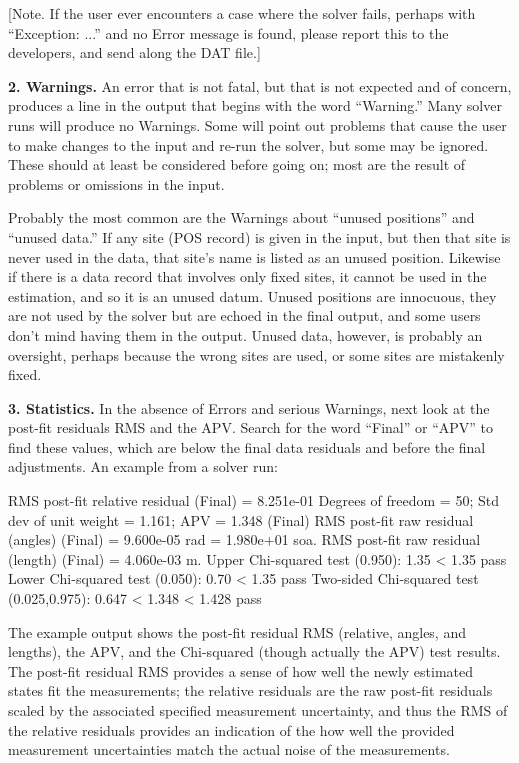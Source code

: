 [Note. If the user ever encounters a case where the solver fails, perhaps with ``Exception: ...'' and no Error message is found, please report this to the developers, and send along the DAT file.]

\textbf{2. Warnings.} An error that is not fatal, but that is not expected and of concern, produces a line in the output that begins with the word ``Warning.'' Many solver runs will produce no Warnings. Some will point out problems that cause the user to make changes to the input and re-run the solver, but some may be ignored. These should at least be considered before going on; most are the result of problems or omissions in the input.

Probably the most common are the Warnings about ``unused positions'' and ``unused data.'' If any site (POS record) is given in the input, but then that site is never used in the data, that site's name is listed as an unused position. Likewise if there is a data record that involves only fixed sites, it cannot be used in the estimation, and so it is an unused datum. Unused positions are innocuous, they are not used by the solver but are echoed in the final output, and some users don't mind having them in the output. Unused data, however, is probably an oversight, perhaps because the wrong sites are used, or some sites are mistakenly fixed.

\textbf{3. Statistics.} In the absence of Errors and serious Warnings, next look at the post-fit residuals RMS and the APV. Search for the word ``Final'' or ``APV'' to find these values, which are below the final data residuals and before the final adjustments. An example from a solver run:

\begin{Snippet}
 RMS post-fit relative residual (Final) = 8.251e-01
 Degrees of freedom = 50; Std dev of unit weight = 1.161; APV = 1.348 (Final)
 RMS post-fit raw residual (angles) (Final) = 9.600e-05 rad = 1.980e+01 soa.
 RMS post-fit raw residual (length) (Final) = 4.060e-03 m.
 Upper Chi-squared test (0.950): 1.35 < 1.35 pass
 Lower Chi-squared test (0.050): 0.70 < 1.35 pass
 Two-sided Chi-squared test (0.025,0.975): 0.647 < 1.348 < 1.428 pass
\end{Snippet}

The example output shows the post-fit residual RMS (relative, angles, and lengths), the APV, and the Chi-squared (though actually the APV) test results. The post-fit residual RMS provides a sense of how well the newly estimated states fit the measurements; the relative residuals are the raw post-fit residuals scaled by the associated specified measurement uncertainty, and thus the RMS of the relative residuals provides an indication of the how well the provided measurement uncertainties match the actual noise of the measurements. 

